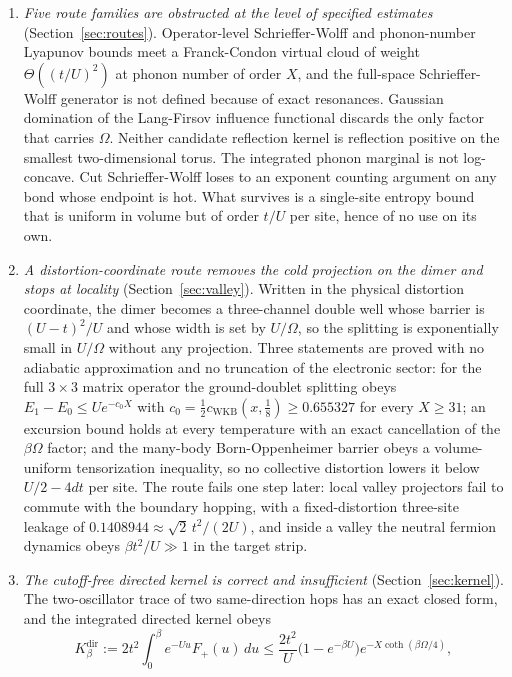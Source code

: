 \documentclass[11pt]{article}
\theoremstyle{definition}
\theoremstyle{remark}
\newcommand{\Dir}{K_{\beta}^{\mathrm{dir}}}
\begin{document}
\begin{enumerate}[label=(\Alph*),leftmargin=2.2em]
\item \emph{Five route families are obstructed at the level of specified
estimates} (Section~\ref{sec:routes}). Operator-level Schrieffer-Wolff and
phonon-number Lyapunov bounds meet a Franck-Condon virtual cloud of weight
$\Theta((t/U)^{2})$ at phonon number of order $X$, and the full-space
Schrieffer-Wolff generator is not defined because of exact resonances. Gaussian
domination of the Lang-Firsov influence functional discards the only factor that
carries $\Omega$. Neither candidate reflection kernel is reflection positive on
the smallest two-dimensional torus. The integrated phonon marginal is not
log-concave. Cut Schrieffer-Wolff loses to an exponent counting argument on any
bond whose endpoint is hot. What survives is a single-site entropy bound that is
uniform in volume but of order $t/U$ per site, hence of no use on its own.
\item \emph{A distortion-coordinate route removes the cold projection on the dimer
and stops at locality} (Section~\ref{sec:valley}). Written in the physical
distortion coordinate, the dimer becomes a three-channel double well whose barrier
is $(U-t)^{2}/U$ and whose width is set by $U/\Omega$, so the splitting is
exponentially small in $U/\Omega$ without any projection. Three statements are
proved with no adiabatic approximation and no truncation of the electronic sector:
for the full $3\times3$ matrix operator the ground-doublet splitting obeys
$E_{1}-E_{0}\le Ue^{-c_{0}X}$ with
$c_{0}=\frac12c_{\mathrm{WKB}}(x,\frac18)\ge0.655327$ for every $X\ge31$; an
excursion bound holds at every temperature with an exact cancellation of the
$\beta\Omega$ factor; and the many-body Born-Oppenheimer barrier obeys a
volume-uniform tensorization inequality, so no collective distortion lowers it
below $U/2-4dt$ per site. The route fails one step later: local valley projectors
fail to commute with the boundary hopping, with a fixed-distortion three-site
leakage of $0.1408944\approx\sqrt{2}\,t^{2}/(2U)$, and inside a valley the neutral
fermion dynamics obeys $\beta t^{2}/U\gg1$ in the target strip.
\item \emph{The cutoff-free directed kernel is correct and insufficient}
(Section~\ref{sec:kernel}). The two-oscillator trace of two same-direction hops
has an exact closed form, and the integrated directed kernel obeys
\begin{equation}
\Dir:=2t^{2}\int_{0}^{\beta}e^{-Uu}F_{+}(u)\,du
\le\frac{2t^{2}}{U}\bigl(1-e^{-\beta U}\bigr)e^{-X\coth(\beta\Omega/4)} ,

\end{equation}
\end{enumerate}
\end{document}

